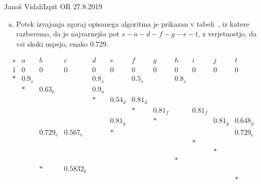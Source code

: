 \begin{naloga}{Janoš Vidali}{Izpit OR 27.8.2019}
\begin{odgovor}
\begin{enumerate}[(a)]
\item Potek izvajanja zgoraj opisanega algoritma je prikazan v tabeli~\tab,
iz katere razberemo,
da je najvarnejša pot $s - a - d - f - g - e - t$,
z verjetnostjo, da vsi skoki uspejo, enako $0.729$.
\end{enumerate}
%
\begin{tabela}
$$
\begin{array}{cccccccccccc}
s & a & b & c & d & e & f & g & h & i & j & t \\ \hline
1 & 0 & 0 & 0 & 0 & 0 & 0 & 0 & 0 & 0 & 0 & 0 \\
* & 0.9_s &&& 0.8_s && 0.5_s && 0.8_s &&& \\
& * & 0.63_a && 0.9_a &&&&&&& \\
&&&& * & 0.54_d & 0.81_d &&&&& \\
&&&&&& * & 0.81_f && 0.81_f && \\
&&&&& 0.81_g && * &&& 0.81_g & 0.648_g \\
&& 0.729_e & 0.567_e && * &&&&&& 0.729_e \\
&&&&&&&&& * && \\
&&&&&&&&&& * & \\
&&&&&&&& * &&& \\
&& * & 0.5832_b &&&&&&&& \\
&&&&&&&&&&& * \\
\end{array}
$$
\end{tabela}
\end{odgovor}
\end{naloga}
